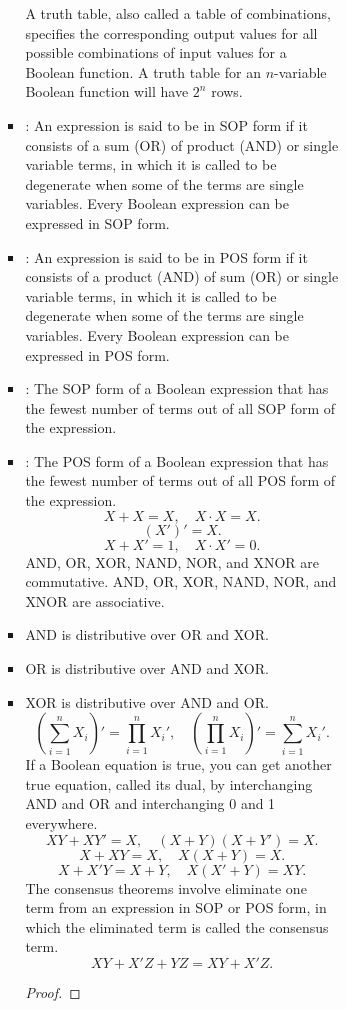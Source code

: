 \documentclass[a4paper,12pt]{report}
\begin{document}
\begin{itemize}
\begin{itemize}
\begin{itemize}
\begin{itemize}
\begin{itemize}
\begin{itemize}
\begin{itemize}
\begin{itemize}
A truth table, also called a table of combinations, specifies the corresponding output values for all possible combinations of input values for a Boolean function. A truth table for an $n$-variable Boolean function will have $2^n$ rows.
\bit
\item{}: An expression is said to be in SOP form if it consists of a sum (OR) of product (AND) or single variable terms, in which it is called to be degenerate when some of the terms are single variables. Every Boolean expression can be expressed in SOP form.
\item{}: An expression is said to be in POS form if it consists of a product (AND) of sum (OR) or single variable terms, in which it is called to be degenerate when some of the terms are single variables. Every Boolean expression can be expressed in POS form.
\item{}: The SOP form of a Boolean expression that has the fewest number of terms out of all SOP form of the expression.
\item{}: The POS form of a Boolean expression that has the fewest number of terms out of all POS form of the expression.
\eit
{}
\[X + X = X,\quad X\cdot X = X.\]
\[(X′)′ = X.\]
\[X + X′ = 1 ,\quad X\cdot X′ = 0 .\]
AND, OR, XOR, NAND, NOR, and XNOR are commutative.
AND, OR, XOR, NAND, NOR, and XNOR are associative.
\bit
\item AND is distributive over OR and XOR.
\item OR is distributive over AND and XOR.
\item XOR is distributive over AND and OR.
\eit
{}
\[(\sum_{i=1}^nX_i)′=\prod_{i=1}^nX_i',\quad (\prod_{i=1}^nX_i)'=\sum_{i=1}^nX_i'.\]
If a Boolean equation is true, you can get another true equation, called its dual, by interchanging AND and OR and interchanging 0 and 1 everywhere.
\[XY+XY'=X,\quad (X+Y)(X+Y')=X.\]
\[X+XY=X,\quad X(X+Y)=X.\]
\[X+X'Y=X+Y,\quad X(X'+Y)=XY.\]
The consensus theorems involve eliminate one term from an expression in SOP or POS form, in which the eliminated term is called the consensus term.
\[XY+X′Z+YZ=XY+X′Z.\]
\begin{proof}

\end{proof}
\end{itemize}
\end{itemize}
\end{itemize}
\end{itemize}
\end{itemize}
\end{itemize}
\end{itemize}
\end{itemize}
\end{document}
